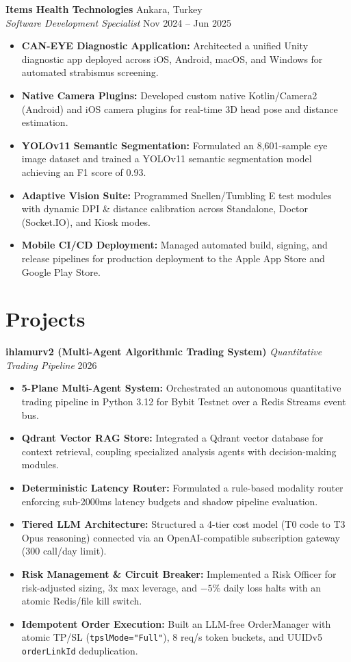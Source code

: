 \documentclass[10pt, a4paper]{article}
\begin{document}
\vspace{0.12cm}

\textbf{Items Health Technologies} \hfill Ankara, Turkey \\
\textit{Software Development Specialist} \hfill Nov 2024 -- Jun 2025
\begin{itemize}
    \item \textbf{CAN-EYE Diagnostic Application:} Architected a unified Unity diagnostic app deployed across iOS, Android, macOS, and Windows for automated strabismus screening.
    \item \textbf{Native Camera Plugins:} Developed custom native Kotlin/Camera2 (Android) and iOS camera plugins for real-time 3D head pose and distance estimation.
    \item \textbf{YOLOv11 Semantic Segmentation:} Formulated an 8,601-sample eye image dataset and trained a YOLOv11 semantic segmentation model achieving an F1 score of 0.93.
    \item \textbf{Adaptive Vision Suite:} Programmed Snellen/Tumbling E test modules with dynamic DPI \& distance calibration across Standalone, Doctor (Socket.IO), and Kiosk modes.
    \item \textbf{Mobile CI/CD Deployment:} Managed automated build, signing, and release pipelines for production deployment to the Apple App Store and Google Play Store.
\end{itemize}

\section{Projects}

\textbf{ihlamurv2 (Multi-Agent Algorithmic Trading System)} \hfill \textit{Quantitative Trading Pipeline} \hfill 2026
\begin{itemize}
    \item \textbf{5-Plane Multi-Agent System:} Orchestrated an autonomous quantitative trading pipeline in Python 3.12 for Bybit Testnet over a Redis Streams event bus.
    \item \textbf{Qdrant Vector RAG Store:} Integrated a Qdrant vector database for context retrieval, coupling specialized analysis agents with decision-making modules.
    \item \textbf{Deterministic Latency Router:} Formulated a rule-based modality router enforcing sub-2000ms latency budgets and shadow pipeline evaluation.
    \item \textbf{Tiered LLM Architecture:} Structured a 4-tier cost model (T0 code to T3 Opus reasoning) connected via an OpenAI-compatible subscription gateway (300 call/day limit).
    \item \textbf{Risk Management \& Circuit Breaker:} Implemented a Risk Officer for risk-adjusted sizing, 3x max leverage, and $-5\%$ daily loss halts with an atomic Redis/file kill switch.
    \item \textbf{Idempotent Order Execution:} Built an LLM-free OrderManager with atomic TP/SL (\texttt{tpslMode="Full"}), 8 req/s token buckets, and UUIDv5 \texttt{orderLinkId} deduplication.
\end{itemize}
\end{document}

